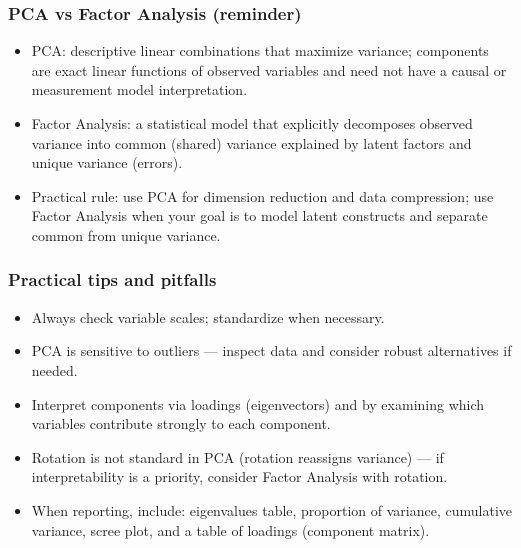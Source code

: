 \documentclass[aspectratio=169]{beamer}
\begin{document}
\begin{frame}
\frametitle{PCA vs Factor Analysis (reminder)}
\begin{itemize}
    \item PCA: descriptive linear combinations that maximize variance; components are exact linear functions of observed variables and need not have a causal or measurement model interpretation. \pause
    \item Factor Analysis: a statistical model that explicitly decomposes observed variance into common (shared) variance explained by latent factors and unique variance (errors). \pause
    \item Practical rule: use PCA for dimension reduction and data compression; use Factor Analysis when your goal is to model latent constructs and separate common from unique variance. \pause
\end{itemize}
\end{frame}

\begin{frame}
\frametitle{Practical tips and pitfalls}
\begin{itemize}
    \item Always check variable scales; standardize when necessary. \pause
    \item PCA is sensitive to outliers — inspect data and consider robust alternatives if needed. \pause
    \item Interpret components via loadings (eigenvectors) and by examining which variables contribute strongly to each component. \pause
    \item Rotation is not standard in PCA (rotation reassigns variance) — if interpretability is a priority, consider Factor Analysis with rotation. \pause
    \item When reporting, include: eigenvalues table, proportion of variance, cumulative variance, scree plot, and a table of loadings (component matrix). \pause
\end{itemize}
\end{frame}
\end{document}
